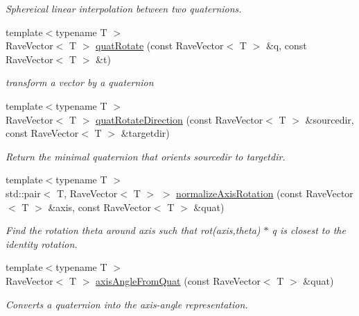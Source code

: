 \begin{DoxyCompactItemize}
\begin{DoxyCompactList}\small\item\em Sphereical linear interpolation between two quaternions. \item\end{DoxyCompactList}\item 
{\footnotesize template$<$typename T $>$ }\\RaveVector$<$ T $>$ \hyperlink{group__affine__math_ga53ddf2e9014f577a6915e180a3cf01e1}{quatRotate} (const RaveVector$<$ T $>$ \&q, const RaveVector$<$ T $>$ \&t)
\begin{DoxyCompactList}\small\item\em transform a vector by a quaternion \item\end{DoxyCompactList}\item 
{\footnotesize template$<$typename T $>$ }\\RaveVector$<$ T $>$ \hyperlink{group__affine__math_gaa6b1411c303ea16ecb279ae4a08735c0}{quatRotateDirection} (const RaveVector$<$ T $>$ \&sourcedir, const RaveVector$<$ T $>$ \&targetdir)
\begin{DoxyCompactList}\small\item\em Return the minimal quaternion that orients sourcedir to targetdir. \item\end{DoxyCompactList}\item 
{\footnotesize template$<$typename T $>$ }\\std::pair$<$ T, RaveVector$<$ T $>$ $>$ \hyperlink{group__affine__math_ga436efaa950bb38f3b3b8a891e5da5591}{normalizeAxisRotation} (const RaveVector$<$ T $>$ \&axis, const RaveVector$<$ T $>$ \&quat)
\begin{DoxyCompactList}\small\item\em Find the rotation theta around axis such that rot(axis,theta) $\ast$ q is closest to the identity rotation. \item\end{DoxyCompactList}\item 
{\footnotesize template$<$typename T $>$ }\\RaveVector$<$ T $>$ \hyperlink{group__affine__math_ga95a2de86a8789000c0a12ce91bbefe0c}{axisAngleFromQuat} (const RaveVector$<$ T $>$ \&quat)
\begin{DoxyCompactList}\small\item\em Converts a quaternion into the axis-\/angle representation. \item\end{DoxyCompactList}\item 

\end{DoxyCompactItemize}
